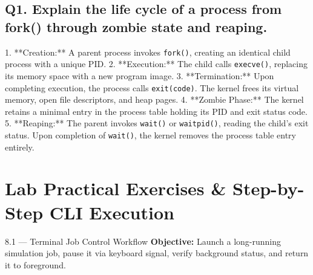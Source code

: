 \subsection*{Q1. Explain the life cycle of a process from fork() through zombie state and reaping.}
\begin{vivasol}
1. **Creation:** A parent process invokes \texttt{fork()}, creating an identical child process with a unique PID.
2. **Execution:** The child calls \texttt{execve()}, replacing its memory space with a new program image.
3. **Termination:** Upon completing execution, the process calls \texttt{exit(code)}. The kernel frees its virtual memory, open file descriptors, and heap pages.
4. **Zombie Phase:** The kernel retains a minimal entry in the process table holding its PID and exit status code.
5. **Reaping:** The parent invokes \texttt{wait()} or \texttt{waitpid()}, reading the child's exit status. Upon completion of \texttt{wait()}, the kernel removes the process table entry entirely.
\end{vivasol}

\section{Lab Practical Exercises \& Step-by-Step CLI Execution}

\begin{practicalbox}{8.1 --- Terminal Job Control Workflow}
\textbf{Objective:} Launch a long-running simulation job, pause it via keyboard signal, verify background status, and return it to foreground.
\end{practicalbox}
